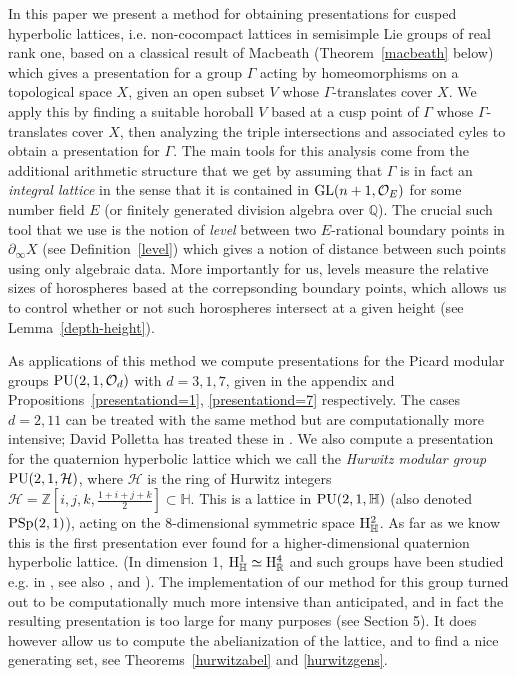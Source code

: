 \documentclass{article}[12pt]
\newcommand{\R}{\mathbb{R}}
\newcommand{\Z}{\mathbb{Z}}
\newcommand{\Q}{\mathbb{Q}}
\newcommand{\quat}{\mathbb{H}}
\begin{document}
 In this paper we present a method for obtaining presentations for cusped hyperbolic lattices, i.e. non-cocompact lattices in semisimple Lie groups of real rank one, based on a classical result of Macbeath  (Theorem~\ref{macbeath} below) which gives a presentation for a group $\Gamma$ acting by homeomorphisms on a topological space $X$, given an open subset $V$ whose $\Gamma$-translates cover $X$. We apply this by finding a suitable horoball $V$ based at a cusp point of $\Gamma$ whose $\Gamma$-translates cover $X$, then analyzing the triple intersections and associated cyles to obtain a presentation for $\Gamma$. The main tools for this analysis come from the additional arithmetic structure that we get by assuming that $\Gamma$ is in fact an \emph{integral lattice} in the sense that it is contained in ${\rm GL}(n+1,\mathcal{O}_E)$ for some number field $E$ (or finitely generated division algebra over $\Q$). The crucial such tool that we use is the notion of \emph{level} between two $E$-rational boundary points in $\partial_\infty X$ (see Definition~\ref{level}) which gives a notion of distance between such points using only algebraic data. More importantly for us, levels measure the relative sizes of horospheres based at the correpsonding boundary points, which allows us to control whether or not such horospheres intersect at a given height (see Lemma~\ref{depth-height}). 
   
As applications of this method we compute presentations for the Picard modular groups ${\rm PU}(2,1,\mathcal{O}_d)$ with $d=3,1,7$, given in the appendix and Propositions~\ref{presentationd=1}, \ref{presentationd=7} respectively. The cases $d=2,11$ can be treated with the same method but are computationally more intensive; David Polletta has treated these in \cite{Po}. 
We also compute a presentation for the quaternion hyperbolic lattice which we call the \emph{Hurwitz modular group} ${\rm PU}(2,1,\mathcal{H})$, where $\mathcal{H}$ is the ring of Hurwitz integers $\mathcal{H}=\Z [i,j,k,\frac{1+i+j+k}{2}] \subset \quat$. This is a lattice in ${\rm PU}(2,1,\quat)$ (also denoted ${\rm PSp}(2,1)$), acting on the 8-dimensional symmetric space ${\rm H}^2_\quat$. As far as we know this is the first presentation ever found for a higher-dimensional quaternion hyperbolic lattice. (In dimension 1, ${\rm H}^1_\quat \simeq {\rm H}^4_\R$ and such groups have been studied e.g. in \cite{DVV}, see also \cite{A}, \cite{W} and \cite{Ph}). The implementation of our method for this group turned out to be computationally much more intensive than anticipated, and in fact the resulting presentation is too large for many purposes (see Section 5). It does however allow us to compute the abelianization of the lattice, and to find a nice generating set, see Theorems~\ref{hurwitzabel} and \ref{hurwitzgens}.
\end{document}
